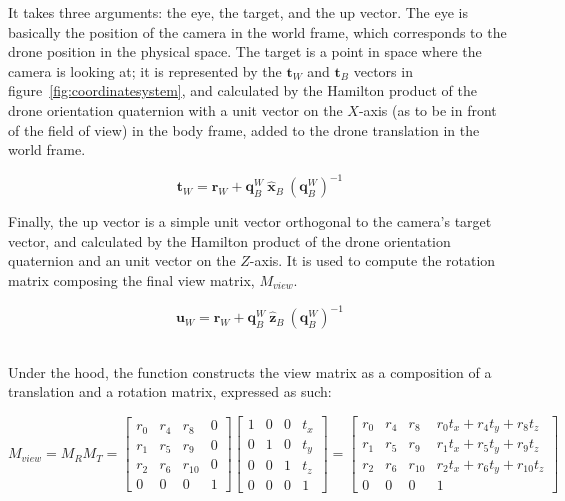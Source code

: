It takes three arguments: the eye, the target, and the up vector. The eye is
basically the position of the camera in the world frame, which corresponds to
the drone position in the physical space. The target is a point in space where
the camera is looking at; it is represented by the $\mathbf{t}_W$ and
$\mathbf{t}_B$ vectors in figure~\ref{fig:coordinatesystem}, and calculated by the
Hamilton product of the drone orientation quaternion with a unit vector on the
$X$-axis (as to be in front of the field of view) in the body frame, added to
the drone translation in the world frame.

\begin{equation} \label{equ:targetvector}
	\mathbf{t}_W = \mathbf{r}_W + \mathbf{q}_B^W\:\mathbf{\hat{x}}_B\:
	(\mathbf{q}_{B}^{W})^{-1}
\end{equation}

Finally, the up vector is a simple unit vector orthogonal to the camera's
target vector, and calculated by the Hamilton product of the drone orientation
quaternion and an unit vector on the $Z$-axis. It is used to compute the
rotation matrix composing the final view matrix, $M_{view}$.

\begin{equation} \label{equ:upvector}
	\mathbf{u}_W = \mathbf{r}_W + \mathbf{q}_B^W \:\mathbf{\hat{z}}_B\:
	(\mathbf{q}_B^W)^{-1}
\end{equation}

~\\Under the hood, the  function constructs the view matrix
as a composition of a translation and a rotation matrix, expressed as such:

\begin{equation} \label{equ:viewmatrix}
	M_{view} = M_R M_T = \begin{bmatrix}
							r_0 & r_4 & r_8 & 0\\
							r_1 & r_5 & r_9 & 0\\
							r_2 & r_6 & r_10 & 0\\
							0 & 0 & 0 & 1
						\end{bmatrix}
						\begin{bmatrix}
							1 & 0 & 0 & t_x\\
							0 & 1 & 0 & t_y\\
							0 & 0 & 1 & t_z\\
							0 & 0 & 0 & 1
						\end{bmatrix}
					=
						\begin{bmatrix}
							r_0 & r_4 & r_8 & r_0 t_x + r_4 t_y + r_8 t_z\\
							r_1 & r_5 & r_9 & r_1 t_x + r_5 t_y + r_9 t_z\\
							r_2 & r_6 & r_10 & r_2 t_x + r_6 t_y + r_10 t_z\\
							0 & 0 & 0 & 1
						\end{bmatrix}
\end{equation}

